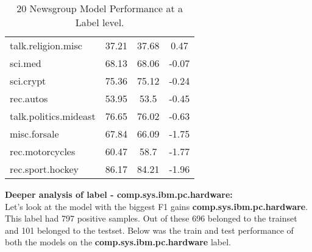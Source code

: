 \begin{table}[htbp]
\begin{tabular}{l|c|c|c|}
talk.religion.misc         & 37.21                                                            & 37.68                                                        & 0.47                                                              \\
sci.med                    & 68.13                                                            & 68.06                                                        & -0.07                                                             \\
sci.crypt                  & 75.36                                                            & 75.12                                                        & -0.24                                                             \\
rec.autos                  & 53.95                                                            & 53.5                                                         & -0.45                                                             \\
talk.politics.mideast      & 76.65                                                            & 76.02                                                        & -0.63                                                             \\
misc.forsale               & 67.84                                                            & 66.09                                                        & -1.75                                                             \\
rec.motorcycles            & 60.47                                                            & 58.7                                                         & -1.77                                                             \\
rec.sport.hockey           & 86.17                                                            & 84.21                                                        & -1.96                                                            
\end{tabular}
\caption{\label{tab:widgets}20 Newsgroup Model Performance at a Label level.}
\end{table}

\noindent \textbf{Deeper analysis of label - comp.sys.ibm.pc.hardware:}\\

Let's look at the model with the biggest F1 gains \textbf{comp.sys.ibm.pc.hardware}. This label had 797 positive samples. Out of these 696 belonged to the trainset and 101 belonged to the testset. Below was the train and test performance of both the models on the \textbf{comp.sys.ibm.pc.hardware} label.

